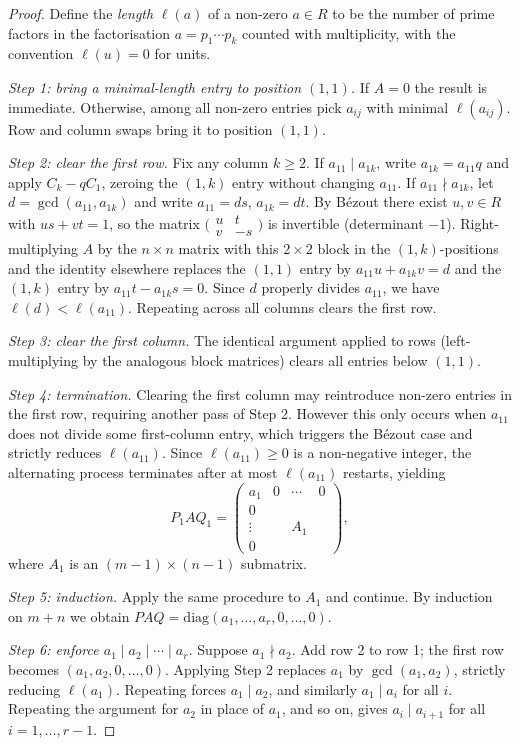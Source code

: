 \documentclass[12pt]{article}
\begin{document}
\begin{proof}
Define the \emph{length} $\ell(a)$ of a non-zero $a \in R$ to be the number of prime factors in the factorisation $a = p_1 \cdots p_k$ counted with multiplicity, with the convention $\ell(u) = 0$ for units.

\textit{Step 1: bring a minimal-length entry to position $(1,1)$.}
If $A = 0$ the result is immediate. Otherwise, among all non-zero entries pick $a_{ij}$ with minimal $\ell(a_{ij})$. Row and column swaps bring it to position $(1,1)$.

\textit{Step 2: clear the first row.}
Fix any column $k \geq 2$. If $a_{11} \mid a_{1k}$, write $a_{1k} = a_{11}q$ and apply $C_k - qC_1$, zeroing the $(1,k)$ entry without changing $a_{11}$. If $a_{11} \nmid a_{1k}$, let $d = \gcd(a_{11}, a_{1k})$ and write $a_{11} = ds$, $a_{1k} = dt$. By Bézout there exist $u, v \in R$ with $us + vt = 1$, so the matrix $\bigl(\begin{smallmatrix} u & t \\ v & -s \end{smallmatrix}\bigr)$ is invertible (determinant $-1$). Right-multiplying $A$ by the $n \times n$ matrix with this $2 \times 2$ block in the $(1,k)$-positions and the identity elsewhere replaces the $(1,1)$ entry by $a_{11}u + a_{1k}v = d$ and the $(1,k)$ entry by $a_{11}t - a_{1k}s = 0$. Since $d$ properly divides $a_{11}$, we have $\ell(d) < \ell(a_{11})$. Repeating across all columns clears the first row.

\textit{Step 3: clear the first column.}
The identical argument applied to rows (left-multiplying by the analogous block matrices) clears all entries below $(1,1)$.

\textit{Step 4: termination.}
Clearing the first column may reintroduce non-zero entries in the first row, requiring another pass of Step 2. However this only occurs when $a_{11}$ does not divide some first-column entry, which triggers the Bézout case and strictly reduces $\ell(a_{11})$. Since $\ell(a_{11}) \geq 0$ is a non-negative integer, the alternating process terminates after at most $\ell(a_{11})$ restarts, yielding
\[
  P_1 A Q_1 = \begin{pmatrix} a_1 & 0 & \cdots & 0 \\ 0 & & & \\ \vdots & & A_1 & \\ 0 & & & \end{pmatrix},
\]
where $A_1$ is an $(m-1)\times(n-1)$ submatrix.

\textit{Step 5: induction.}
Apply the same procedure to $A_1$ and continue. By induction on $m + n$ we obtain $PAQ = \mathrm{diag}(a_1, \ldots, a_r, 0, \ldots, 0)$.

\textit{Step 6: enforce $a_1 \mid a_2 \mid \cdots \mid a_r$.}
Suppose $a_1 \nmid a_2$. Add row 2 to row 1; the first row becomes $(a_1, a_2, 0, \ldots, 0)$. Applying Step 2 replaces $a_1$ by $\gcd(a_1, a_2)$, strictly reducing $\ell(a_1)$. Repeating forces $a_1 \mid a_2$, and similarly $a_1 \mid a_i$ for all $i$. Repeating the argument for $a_2$ in place of $a_1$, and so on, gives $a_i \mid a_{i+1}$ for all $i = 1, \ldots, r-1$.
\end{proof}
\end{document}
